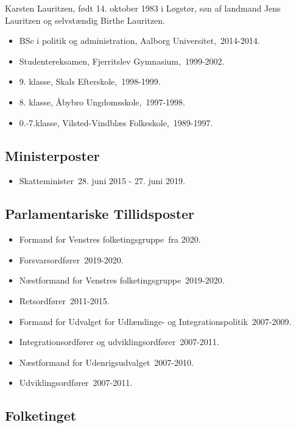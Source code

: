 \documentclass[11pt, a4paper]{awesome-cv}
\begin{document}
\makecvheader[R]
\makelettertitle
\begin{cvletter}
Karsten Lauritzen, født 14. oktober 1983 i Løgstør, søn af landmand Jens Lauritzen og selvstændig Birthe Lauritzen.

\begin{itemize}
\item BSc i politik og administration, Aalborg Universitet, 2014-2014.
\item Studentereksamen, Fjerritslev Gymnasium, 1999-2002.
\item 9. klasse, Skals Efterskole, 1998-1999.
\item 8. klasse, Åbybro Ungdomsskole, 1997-1998.
\item 0.-7.klasse, Vilsted-Vindblæs Folkeskole, 1989-1997.
\end{itemize}
\subsection*{Ministerposter}
\begin{itemize}
\item Skatteminister 28. juni 2015 - 27. juni 2019.
\end{itemize}
\subsection*{Parlamentariske Tillidsposter}
\begin{itemize}
\item Formand for Venstres folketingsgruppe fra 2020.
\item Forsvarsordfører 2019-2020.
\item Næstformand for Venstres folketingsgruppe 2019-2020.
\item Retsordfører 2011-2015.
\item Formand for Udvalget for Udlændinge- og Integrationspolitik 2007-2009.
\item Integrationsordfører og udviklingsordfører 2007-2011.
\item Næstformand for Udenrigsudvalget 2007-2010.
\item Udviklingsordfører 2007-2011.
\end{itemize}
\subsection*{Folketinget}

\end{cvletter}
\end{document}

